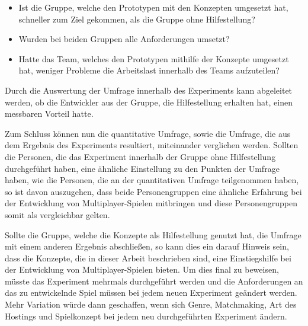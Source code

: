 \begin{itemize}
	\item Ist die Gruppe, welche den Prototypen mit den Konzepten umgesetzt hat, schneller zum Ziel gekommen, als die Gruppe ohne Hilfestellung?
	\item Wurden bei beiden Gruppen alle Anforderungen umsetzt?
	\item Hatte das Team, welches den Prototypen mithilfe der Konzepte umgesetzt hat, weniger Probleme die Arbeitslast innerhalb des Teams aufzuteilen?
\end{itemize}

Durch die Auswertung der Umfrage innerhalb des Experiments kann abgeleitet werden, ob die Entwickler aus der Gruppe, die Hilfestellung erhalten hat, einen messbaren Vorteil hatte.

Zum Schluss können nun die quantitative Umfrage, sowie die Umfrage, die aus dem Ergebnis des Experiments resultiert, miteinander verglichen werden. Sollten die Personen, die das Experiment innerhalb der Gruppe ohne Hilfestellung durchgeführt haben, eine ähnliche Einstellung zu den Punkten der Umfrage haben, wie die Personen, die an der quantitativen Umfrage teilgenommen haben, so ist davon auszugehen, dass beide Personengruppen eine ähnliche Erfahrung bei der Entwicklung von Multiplayer-Spielen mitbringen und diese Personengruppen somit als vergleichbar gelten.

Sollte die Gruppe, welche die Konzepte als Hilfestellung genutzt hat, die Umfrage mit einem anderen Ergebnis abschließen, so kann dies ein darauf Hinweis sein, dass die Konzepte, die in dieser Arbeit beschrieben sind, eine Einstiegshilfe bei der Entwicklung von Multiplayer-Spielen bieten. Um dies final zu beweisen, müsste das Experiment mehrmals durchgeführt werden und die Anforderungen an das zu entwickelnde Spiel müssen bei jedem neuen Experiment geändert werden. Mehr Variation würde dann geschaffen, wenn sich Genre, Matchmaking, Art des Hostings und Spielkonzept bei jedem neu durchgeführten Experiment ändern.